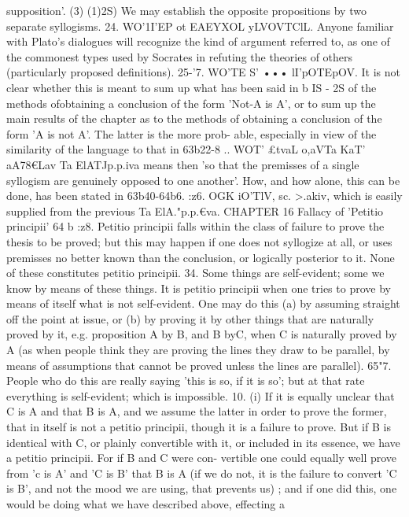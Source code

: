 {supposition'. (3) (1)2S) We may establish the opposite propositions
by two separate syllogisms.
24. WO'1I'EP ot EAEYXOL yLVOVTClL. Anyone familiar with Plato's
dialogues will recognize the kind of argument referred to, as one
of the commonest types used by Socrates in refuting the theories
of others (particularly proposed definitions).
25-'7. WO'TE S' ••• lI'pOTEpOV. It is not clear whether this is
meant to sum up what has been said in b IS - 2S of the methods ofobtaining a conclusion of the form 'Not-A is A', or to sum up the
main results of the chapter as to the methods of obtaining a
conclusion of the form 'A is not A'. The latter is the more prob-
able, especially in view of the similarity of the language to that in
63b22-8 .. WOT' £tvaL o,aVT{a KaT' aA7}8€Lav Ta ElATJp.p.iva means then
'so that the premisses of a single syllogism are genuinely opposed
to one another'. How, and how alone, this can be done, has been
stated in 63b40-64b6.
:z6. OGK iO'TlV, sc. >.a{kiv, which is easily supplied from the
previous Ta ElA."p.p.€va.
CHAPTER 16
Fallacy of 'Petitio principii'
64 b :z8.
Petitio principii falls within the class of failure to prove
the thesis to be proved; but this may happen if one does not
syllogize at all, or uses premisses no better known than the
conclusion, or logically posterior to it. None of these constitutes
petitio principii.
34. Some things are self-evident; some we know by means of
these things. It is petitio principii when one tries to prove by
means of itself what is not self-evident. One may do this (a) by
assuming straight off the point at issue, or (b) by proving it
by other things that are naturally proved by it, e.g. proposition A
by B, and B byC, when C is naturally proved by A (as when people
think they are proving the lines they draw to be parallel, by means
of assumptions that cannot be proved unless the lines are parallel).
65"7. People who do this are really saying 'this is so, if it is so';
but at that rate everything is self-evident; which is impossible.
10. (i) If it is equally unclear that C is A and that B is A, and
we assume the latter in order to prove the former, that in itself
is not a petitio principii, though it is a failure to prove. But if B
is identical with C, or plainly convertible with it, or included in
its essence, we have a petitio principii. For if B and C were con-
vertible one could equally well prove from 'c is A' and 'C is B'
that B is A (if we do not, it is the failure to convert 'C is B', and
not the mood we are using, that prevents us) ; and if one did this,
one would be doing what we have described above, effecting a
}}
